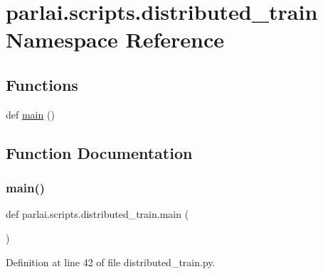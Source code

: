 \hypertarget{namespaceparlai_1_1scripts_1_1distributed__train}{}\section{parlai.\+scripts.\+distributed\+\_\+train Namespace Reference}
\label{namespaceparlai_1_1scripts_1_1distributed__train}
\subsection*{Functions}
\begin{DoxyCompactItemize}
\item 
def \hyperlink{namespaceparlai_1_1scripts_1_1distributed__train_a8fb5ab65a3210ae3a91ec244aeaf49f7}{main} ()
\end{DoxyCompactItemize}


\subsection{Function Documentation}
\mbox{\label{namespaceparlai_1_1scripts_1_1distributed__train_a8fb5ab65a3210ae3a91ec244aeaf49f7}} 
\subsubsection{\texorpdfstring{main()}{main()}}
{\footnotesize\ttfamily def parlai.\+scripts.\+distributed\+\_\+train.\+main (\begin{DoxyParamCaption}{ }\end{DoxyParamCaption})}



Definition at line 42 of file distributed\+\_\+train.\+py.


